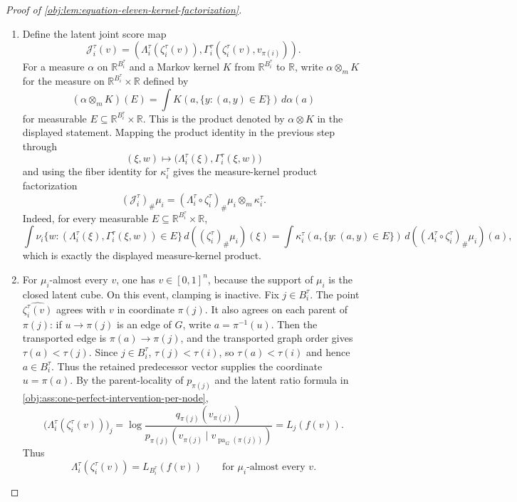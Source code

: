 \begin{proof}[Proof of \cref{obj:lem:equation-eleven-kernel-factorization}]
\begin{enumerate}
\item Define the latent joint score map
\[
\mathcal J_i^\tau(v)
=
\left(
\Lambda_i^\tau(\zeta_i^\tau(v)),
\Gamma_i^\tau(\zeta_i^\tau(v),v_{\pi(i)})
\right).
\]
For a measure \(\alpha\) on \(\mathbb R^{B_i^\tau}\) and a Markov kernel \(K\) from \(\mathbb R^{B_i^\tau}\) to \(\mathbb R\), write \(\alpha\otimes_{\!m}K\) for the measure on \(\mathbb R^{B_i^\tau}\times\mathbb R\) defined by
\[
(\alpha\otimes_{\!m}K)(E)
=
\int K(a,\{y:(a,y)\in E\})\,d\alpha(a)
\]
for measurable \(E\subseteq\mathbb R^{B_i^\tau}\times\mathbb R\). This is the product denoted by \(\alpha\otimes K\) in the displayed statement. Mapping the product identity in the previous step through
\[
(\xi,w)\longmapsto
\bigl(\Lambda_i^\tau(\xi),\Gamma_i^\tau(\xi,w)\bigr)
\]
and using the fiber identity for \(\kappa_i^\tau\) gives the measure-kernel product factorization
\[
(\mathcal J_i^\tau)_{\#}\mu_i
=
(\Lambda_i^\tau\circ \zeta_i^\tau)_{\#}\mu_i
\otimes_{\!m} \kappa_i^\tau .
\]
Indeed, for every measurable \(E\subseteq \mathbb R^{B_i^\tau}\times\mathbb R\),
\[
\int
\nu_i\{w:(\Lambda_i^\tau(\xi),\Gamma_i^\tau(\xi,w))\in E\}\,
d((\zeta_i^\tau)_{\#}\mu_i)(\xi)
=
\int
\kappa_i^\tau(a,\{y:(a,y)\in E\})\,
d((\Lambda_i^\tau\circ\zeta_i^\tau)_{\#}\mu_i)(a),
\]
which is exactly the displayed measure-kernel product. %

\item For \(\mu_i\)-almost every \(v\), one has \(v\in[0,1]^n\), because the support of \(\mu_i\) is the closed latent cube. On this event, clamping is inactive. Fix \(j\in B_i^\tau\). The point \(\widehat{\zeta_i^\tau(v)}\) agrees with \(v\) in coordinate \(\pi(j)\). It also agrees on each parent of \(\pi(j)\): if \(u\to\pi(j)\) is an edge of \(G\), write \(a=\pi^{-1}(u)\). Then the transported edge is \(\pi(a)\to\pi(j)\), and the transported graph order gives \(\tau(a)<\tau(j)\). Since \(j\in B_i^\tau\), \(\tau(j)<\tau(i)\), so \(\tau(a)<\tau(i)\) and hence \(a\in B_i^\tau\). Thus the retained predecessor vector supplies the coordinate \(u=\pi(a)\). By the parent-locality of \(p_{\pi(j)}\) and the latent ratio formula in \cref{obj:ass:one-perfect-intervention-per-node},
\[
\bigl(\Lambda_i^\tau(\zeta_i^\tau(v))\bigr)_j
=
\log
\frac{q_{\pi(j)}(v_{\pi(j)})}
{p_{\pi(j)}(v_{\pi(j)}\mid v_{\operatorname{pa}_G(\pi(j))})}
=
L_j(f(v)).
\]
Thus
\[
\Lambda_i^\tau(\zeta_i^\tau(v))
=
L_{B_i^\tau}(f(v))
\qquad
\text{for \(\mu_i\)-almost every }v .
\] %


\end{enumerate}
\end{proof}
